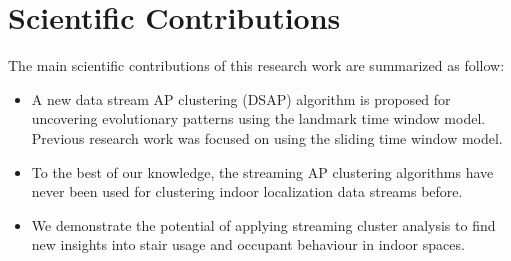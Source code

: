 



 






\section{Scientific Contributions}


The main scientific contributions of this research work are summarized as follow:

\begin{itemize}
    
    \item A new data stream AP clustering (DSAP) algorithm is proposed for uncovering evolutionary patterns using the landmark time window model. Previous research work was focused on using the sliding time window model.
    
    \item  To the best of our knowledge, the streaming AP clustering algorithms have never been used for clustering indoor localization data streams before. 
    
    \item We demonstrate the potential of applying streaming cluster analysis to find new insights into stair usage and occupant behaviour in indoor spaces.
\end{itemize}


